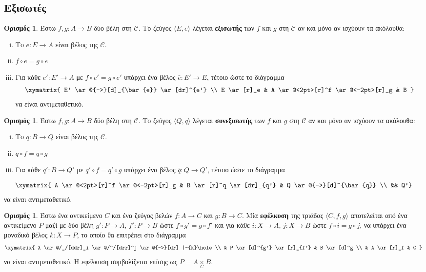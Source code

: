 \documentclass [a4paper,11pt] {book}
\theoremstyle{definition}
\theoremstyle{definition}
\newtheorem{definition}[theorem]{Ορισμός}
\begin{document}
\subsection{Εξισωτές}
\label{equalizers}
\begin{definition}\label{equalizer}
Έστω $f,g:A \to B$ δύο βέλη στη $\mathcal{C}$. Το ζεύγος $\langle E,e \rangle$ λέγεται \textbf{εξισωτής} των $f$ και $g$ στη $\mathcal{C}$ αν και μόνο αν ισχύουν τα ακόλουθα:
\begin{enumerate}[i.]
\item Το $e:E\to A$ είναι βέλος της $\mathcal{C}$.
\item $ f \circ e= g \circ e$
\item Για κάθε $ e': E' \to A$ με $f \circ e'=g\circ e'$ υπάρχει ένα βέλος $\bar{e}:E' \to E$, τέτοιο ώστε το διάγραμμα
\begin{displaymath}
\xymatrix{
E' \ar@{-->}[d]_{\bar{e}} \ar[dr]^{e'} \\
E \ar[r]_e & A \ar@<2pt>[r]^f \ar@<-2pt>[r]_g & B
}
\end{displaymath}
να είναι αντιμεταθετικό.
\end{enumerate}
\end{definition}
\begin{definition}\label{coequalizer}
Έστω  $f,g:A \to B$ δύο βέλη στη $\mathcal{C}$. Το ζεύγος $\langle Q,q \rangle$ λέγεται \textbf{συνεξισωτής} των $f$ και $g$ στη $\mathcal{C}$ αν και μόνο αν ισχύουν τα ακόλουθα:
\begin{enumerate}[i.]
\item Το $q:B\to Q$ είναι βέλος της $\mathcal{C}$.
\item $ q \circ f= q \circ g$
\item  Για κάθε $ q': B \to Q'$ με $q' \circ f=q'\circ g$ υπάρχει ένα βέλος $\bar{q}:Q \to Q'$, τέτοιο ώστε το διάγραμμα
\end{enumerate}
\begin{displaymath}
\xymatrix{
A \ar@<2pt>[r]^f \ar@<-2pt>[r]_g & B \ar[r]^q \ar[dr]_{q'} & Q \ar@{-->}[d]^{\bar{q}} \\
&& Q'}
\end{displaymath}
να είναι αντιμεταθετικό.
\end{definition}
\begin{definition}\label{pullback}
Έστω ένα αντικείμενο $C$ και ένα ζεύγος βελών $f:A \to C$ και $g: B\to C$. Μία \textbf{εφέλκυση} της τριάδας $\langle C,f,g \rangle$ αποτελείται από ένα αντικείμενο $P$ μαζί με δύο βέλη  $g':P \to A$, $f': P\to B$ ώστε $f \circ g'=g \circ f'$ και για κάθε $i:X \to A$, $j:X \to B$ ώστε $f \circ i = g \circ j$, να υπάρχει ένα μοναδικό βέλος $k: X \to P$, το οποίο θα επιτρέπει στο διάγραμμα
\begin{displaymath}
\xymatrix{
X \ar@/_/[ddr]_i \ar@/^/[drr]^j	\ar@{-->}[dr] |-{k}\hole	\\
	& P \ar[d]^{g'} \ar[r]_{f'}	& B \ar[d]^g \\
	& A \ar[r]_f & C
	}
\end{displaymath}
να είναι αντιμεταθετικό.
Η εφέλκυση συμβολίζεται επίσης ως $P = A \underset{C}{\times} B$.
\end{definition}
\end{document}
